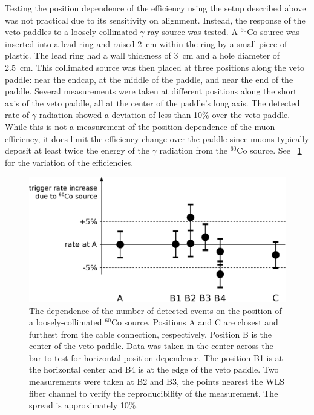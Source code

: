 Testing the position dependence of the efficiency using the setup described above was not practical due to its sensitivity on alignment.  Instead, the response of the veto paddles to a loosely collimated $\gamma$-ray source was tested.  A $^{60}$Co source was inserted into a lead ring and raised 2~cm within the ring by a small piece of plastic.  The lead ring had a wall thickness of 3~cm and a hole diameter of 2.5~cm.  This collimated source was then placed at three positions along the veto paddle: near the endcap, at the middle of the paddle, and near the end of the paddle.  Several measurements were taken at different positions along the short axis of the veto paddle, all at the center of the paddle's long axis. The detected rate of $\gamma$ radiation showed a deviation of less than 10\% over the veto paddle.  While this is not a measurement of the position dependence of the muon efficiency, it does limit the efficiency change over the paddle since muons typically deposit at least twice the energy of the $\gamma$ radiation from the $^{60}$Co source.  See {\fig}~\ref{fig:positionDependence} for the variation of the efficiencies.
\begin{figure}[!htbp]
\centering
\includegraphics[width=1.0\textwidth]{figures/efficiency_positionDependence.eps}
\caption{The dependence of the number of detected events on the position of a loosely-collimated $^{60}$Co source.  Positions A and C are closest and furthest from the cable connection, respectively.  Position B is the center of the veto paddle.  Data was taken in the center across the bar to test for horizontal position dependence.  The position B1 is at the horizontal center and B4 is at the edge of the veto paddle.  Two measurements were taken at B2 and B3, the points nearest the WLS fiber channel to verify the reproducibility of the measurement.  The spread is approximately 10\%.}
\label{fig:positionDependence}
\end{figure}


